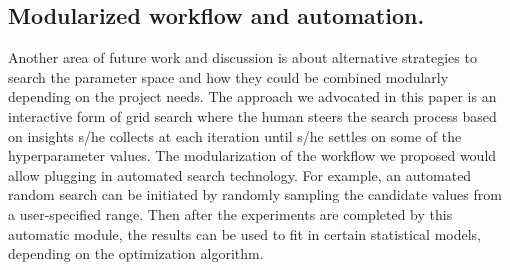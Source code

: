 \documentclass[preprint]{vgtc}        %
\begin{document}



\subsection{Modularized workflow and automation.}
Another area of future work and discussion is about alternative strategies to search the parameter space and how they could be combined modularly depending on the project needs. The approach we advocated in this paper is an interactive form of grid search where the human steers the search process based on insights s/he collects at each iteration until s/he settles on some of the hyperparameter values. 
The modularization of the workflow we proposed would allow plugging in automated search technology. For example, an automated random search can be initiated by randomly sampling the candidate values from a user-specified range. Then after the experiments are completed by this automatic module, the results can be used to fit in certain statistical models, depending on the optimization algorithm.
\end{document}
